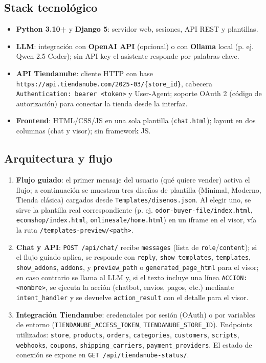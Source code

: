 \documentclass[9pt,a4paper,twocolumn,twoside]{rho-class/rho}
\begin{document}
\subsection{Stack tecnológico}

\begin{itemize}
    \item \textbf{Python 3.10+} y \textbf{Django 5}: servidor web, sesiones, API REST y plantillas.
    \item \textbf{LLM}: integración con \textbf{OpenAI API} (opcional) o con \textbf{Ollama} local (p. ej. Qwen 2.5 Coder); sin API key el asistente responde por palabras clave.
    \item \textbf{API Tiendanube}: cliente HTTP con base \texttt{https://api.tiendanube.com/2025-03/\{store\_id\}}, cabecera \texttt{Authentication: bearer <token>} y User-Agent; soporte OAuth 2 (código de autorización) para conectar la tienda desde la interfaz.
    \item \textbf{Frontend}: HTML/CSS/JS en una sola plantilla (\texttt{chat.html}); layout en dos columnas (chat y visor); sin framework JS.
\end{itemize}

\subsection{Arquitectura y flujo}

\begin{enumerate}
    \item \textbf{Flujo guiado}: el primer mensaje del usuario (qué quiere vender) activa el flujo; a continuación se muestran tres diseños de plantilla (Minimal, Moderno, Tienda clásica) cargados desde \texttt{Templates/disenos.json}. Al elegir uno, se sirve la plantilla real correspondiente (p. ej. \texttt{odor-buyer-file/index.html}, \texttt{ecomshop/index.html}, \texttt{onlinesale/home.html}) en un iframe en el visor, vía la ruta \texttt{/templates-preview/<path>}.
    \item \textbf{Chat y API}: \texttt{POST /api/chat/} recibe \texttt{messages} (lista de \texttt{role}/\texttt{content}); si el flujo guiado aplica, se responde con \texttt{reply}, \texttt{show\_templates}, \texttt{templates}, \texttt{show\_addons}, \texttt{addons}, y \texttt{preview\_path} o \texttt{generated\_page\_html} para el visor; en caso contrario se llama al LLM y, si el texto incluye una línea \texttt{ACCION: <nombre>}, se ejecuta la acción (chatbot, envíos, pagos, etc.) mediante \texttt{intent\_handler} y se devuelve \texttt{action\_result} con el detalle para el visor.
    \item \textbf{Integración Tiendanube}: credenciales por sesión (OAuth) o por variables de entorno (\texttt{TIENDANUBE\_ACCESS\_TOKEN}, \texttt{TIENDANUBE\_STORE\_ID}). Endpoints utilizados: \texttt{store}, \texttt{products}, \texttt{orders}, \texttt{categories}, \texttt{customers}, \texttt{scripts}, \texttt{webhooks}, \texttt{coupons}, \texttt{shipping\_carriers}, \texttt{payment\_providers}. El estado de conexión se expone en \texttt{GET /api/tiendanube-status/}.
\end{enumerate}
\end{document}
